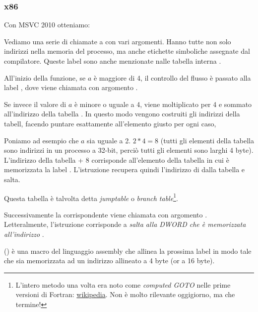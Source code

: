 \subsubsection{x86}


Con MSVC 2010 otteniamo:




Vediamo una serie di chiamate a \printf con vari argomenti. Hanno tutte non solo indirizzi nella memoria del processo, ma anche etichette
simboliche assegnate dal compilatore. Queste label sono anche menzionate nalle tabella interna .

All'inizio della funzione, se $a$ è maggiore di 4, il controllo del flusso è passato alla label 
, dove viene chiamata \printf con argomento .

Se invece il valore di $a$ è minore o uguale a 4, viene moltiplicato per 4 e sommato all'indirizzo della tabella . 
In questo modo vengono costruiti gli indirizzi della tabell, facendo puntare esattamente all'elemento giusto per ogni caso,

Poniamo ad esempio che $a$ sia uguale a 2. $2*4 = 8$ (tutti gli elementi della tabella sono indirizzi in un processo a 32-bit, perciò tutti gli elementi sono larghi 4 byte).
L'indirizzo della tabella  + 8 corrisponde all'elemento della tabella in cui è memorizzata la label .
L'istruzione \JMP recupera quindi l'indirizzo di  dalla tabella e salta.

Questa tabella è talvolta detta \emph{jumptable} o \emph{branch table}\footnote{L'intero metodo una volta era noto come 
\emph{computed GOTO} nelle prime versioni di Fortran:
\href{http://go.yurichev.com/17122}{wikipedia}.
Non è molto rilevante oggigiorno, ma che termine!}.

Successivamente la corrispondente \printf viene chiamata con argomento .\\
Letteralmente, l'istruzione  corrisponde a 
\emph{salta alla DWORD che è memorizzata all'indirizzo} .

 () è una macro del linguaggio assembly che allinea la prossima label in modo tale che sia memorizzata 
ad un indirizzo allineato a 4 byte (or a 16 byte).

